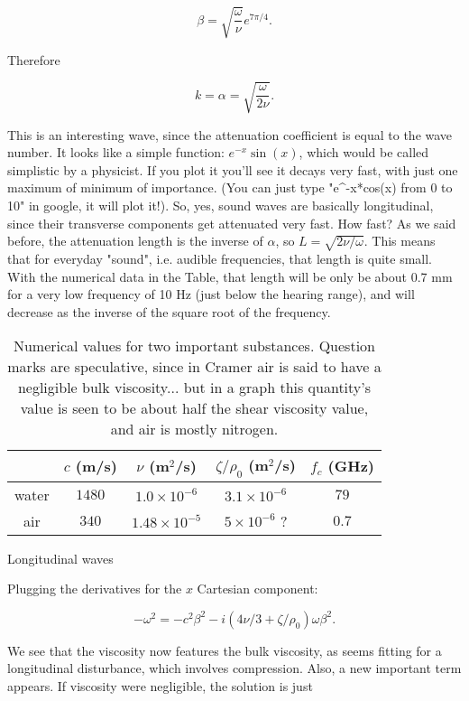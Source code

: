 \[ \beta =\sqrt{ \frac{\omega}{ \nu}}e^{ 7 \pi/4}.\]

Therefore

\[ k=\alpha =\sqrt{ \frac{\omega}{ 2 \nu}}.\]

This is an interesting wave, since the attenuation coefficient is
equal to the wave number. It looks like a simple function: $
e^{-x}\sin(x)$, which would be called simplistic by a physicist. If
you plot it you'll see it decays very fast, with just one maximum of
minimum of importance. (You can just type "e^-x*cos(x) from 0 to 10"
in google, it will plot it!). So, yes, sound waves are basically
longitudinal, since their transverse components get attenuated very
fast. How fast? As we said before, the attenuation length is the
inverse of $ \alpha$, so $ L=\sqrt{2\nu/\omega}$. This means that for
everyday "sound", i.e. audible frequencies, that length is quite
small. With the numerical data in the Table, that length will be only
be about 0.7 mm for a very low frequency of 10 Hz (just below the
hearing range), and will decrease as the inverse of the square root of
the frequency.

\begin{table}
\begin{tabular}{c|c|c|c|c|}

    & $ c$ (m/s) &  $ \nu$ (m$^2$/s) & $\zeta/\rho_0$ (m$^2$/s) & $ f_c$ (GHz)\\
  \hline
  \hline
  water & $1480$& $ 1.0 \times 10^{-6}$ & $ 3.1 \times 10^{-6}$ & $79$ \\
  \hline
  air & $340$   & $ 1.48\times 10^{-5}$ & $ 5 \times 10^{-6}$ ? & $0.7$
  \hline
\end{tabular}
\caption{Numerical values for two important substances. Question marks
  are speculative, since in Cramer air is said to have a negligible
  bulk viscosity... but in a graph this quantity's value is seen to be
  about half the shear viscosity value, and air is mostly nitrogen.}
\end{table}

Longitudinal waves

Plugging the derivatives for the $x$ Cartesian component:

\[ -\omega^2 = - c^2\beta^2 - i (4\nu/3+\zeta/\rho_0)  \omega \beta^2.\]

We see that the viscosity now features the bulk viscosity, as seems
fitting for a longitudinal disturbance, which involves
compression. Also, a new important term appears. If viscosity were
negligible, the solution is just

